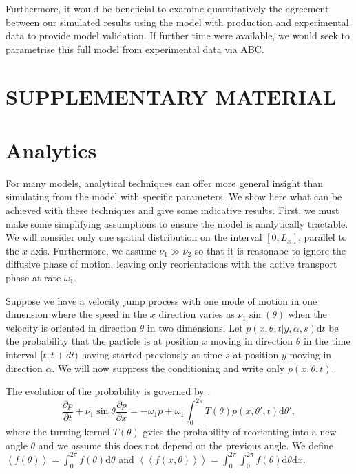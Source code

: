 \documentclass[twocolumn]{biophys}
\def\mean#1{\left< #1 \right>}
\begin{document}
Furthermore, it would be beneficial to examine quantitatively the agreement between our simulated results using the model with production and experimental data to provide model validation.
If further time were available, we would seek to parametrise this full model from experimental data via ABC. 

\section*{SUPPLEMENTARY MATERIAL}


\vspace{1cm}
{}

\appendix
\section{Analytics}
\normalsize
For many models, analytical techniques can offer more general insight than simulating from the model with specific parameters.
We show here what can be achieved with these techniques and give some indicative results.
First, we must make some simplifying assumptions to ensure the model is analytically tractable. We will consider only one spatial distribution on the interval $[0,L_x]$, parallel to the $x$ axis.
Furthermore, we assume $\nu_1 \gg \nu_2$ so that it is reasonabe to ignore the diffusive phase of motion, leaving only reorientations with the active transport phase at rate $\omega_1$.

Suppose we have a velocity jump process with one mode of motion in one dimension where the speed in the $x$ direction varies as $\nu_1 \sin (\theta)$ when the velocity is oriented in direction $\theta$ in two dimensions.
Let $ p(x,\theta,t | y, \alpha, s)\text{d}t$ be the probability that the particle is at position $x$ moving in direction $\theta$ in the time interval $[t,t+dt)$ having started previously at time $s$ at position $y$ moving in direction $\alpha$.
We will now suppress the conditioning and write only $ p(x,\theta, t) $.

The evolution of the probability is governed \citep{othmer1988models} by :
\begin{equation}\label{Evolution}
 \frac{\partial p}{\partial t} + \nu_1 \sin{\theta } \frac{\partial p}{\partial x} = -\omega_1 p + \omega_1 \int_0^{2\pi} T(\theta) p(x,\theta ', t) \text{d} \theta ',
\end{equation}
where the turning kernel $T(\theta)$ gvies the probability of reorienting into a new angle $\theta$ and we assume this does not depend on the previous angle.
We define $\mean{f(\theta)} = \int_0^{2\pi} f(\theta) \text{d} \theta $ and $\mean{\mean{f(x,\theta)}} =  \int_{0}^{2\pi} \int_0^{2\pi} f(\theta) \text{d} \theta \text{d}  x $.
\end{document}
